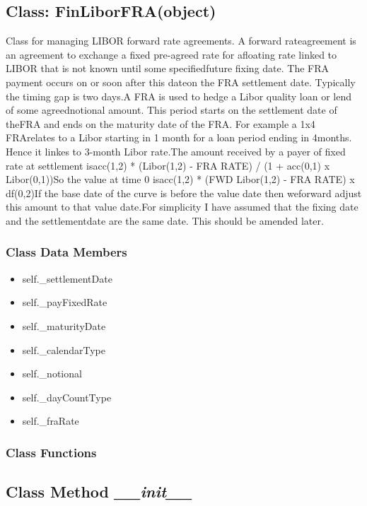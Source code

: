 \documentclass[twoside,11pt]{book}
\begin{document}
\subsection{Class: FinLiborFRA(object)}
Class for managing LIBOR forward rate agreements. A forward rateagreement is an agreement to exchange a fixed pre-agreed rate for afloating rate linked to LIBOR that is not known until some specifiedfuture fixing date. The FRA payment occurs on or soon after this dateon the FRA settlement date. Typically the timing gap is two days.A FRA is used to hedge a Libor quality loan or lend of some agreednotional amount. This period starts on the settlement date of theFRA and ends on the maturity date of the FRA. For example a 1x4 FRArelates to a Libor starting in 1 month for a loan period ending in 4months. Hence it linkes to 3-month Libor rate.The amount received by a payer of fixed rate at settlement isacc(1,2) * (Libor(1,2) - FRA RATE) / (1 + acc(0,1) x Libor(0,1))So the value at time 0 isacc(1,2) * (FWD Libor(1,2) - FRA RATE) x df(0,2)If the base date of the curve is before the value date then weforward adjust this amount to that value date.For simplicity I have assumed that the fixing date and the settlementdate are the same date. This should be amended later. 

\subsubsection{Class Data Members}
\begin{itemize}
\item{self.\_settlementDate}
\item{self.\_payFixedRate}
\item{self.\_maturityDate}
\item{self.\_calendarType}
\item{self.\_notional}
\item{self.\_dayCountType}
\item{self.\_fraRate}
\end{itemize}

\subsubsection{Class Functions}

\subsection{Class Method {\it \_\_init\_\_}}
\end{document}
